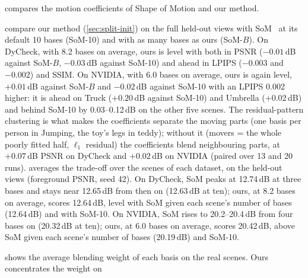 
 compares the motion coefficients of Shape of Motion and our method.


 compare our method (\cref{sec:split-init}) on the full held-out views with SoM~\cite{wang2025shape}
at its default 10 bases (SoM-10) and with as many bases as ours (SoM-$B$). On DyCheck, with
8.2 bases on average, ours is level with both in PSNR ($-0.01$\,dB against SoM-$B$, $-0.03$\,dB against SoM-10) and ahead in
LPIPS ($-0.003$ and $-0.002$) and SSIM. On NVIDIA, with 6.0 bases on average, ours is again level, $+0.01$\,dB against SoM-$B$ and
$-0.02$\,dB against SoM-10 with an LPIPS 0.002 higher: it is ahead on Truck ($+0.20$\,dB against SoM-10) and Umbrella ($+0.02$\,dB) and
behind SoM-10 by 0.03--0.12\,dB on the other five scenes. The residual-pattern clustering is what makes the coefficients separate the
moving parts (one basis per person in Jumping, the toy's legs in teddy); without it (movers = the whole poorly fitted half,
$\ell_1$ residual) the coefficients blend neighbouring parts, at $+0.07$\,dB PSNR on DyCheck and $+0.02$\,dB on NVIDIA
(paired over 13 and 20 runs).
 averages the trade-off over the scenes of each
dataset, on the held-out views (foreground PSNR, seed 42). On DyCheck, SoM peaks at 12.74\,dB at three bases and stays near 12.65\,dB
from then on (12.63\,dB at ten); ours, at 8.2 bases on average, scores 12.64\,dB, level with SoM given each scene's number of bases
(12.64\,dB) and with SoM-10. On NVIDIA, SoM rises to 20.2--20.4\,dB from four bases on (20.32\,dB at ten); ours, at 6.0 bases on
average, scores 20.42\,dB, above SoM given each scene's number of bases (20.19\,dB) and SoM-10.

 shows the average blending weight of each basis on the real scenes. Ours concentrates the weight on
